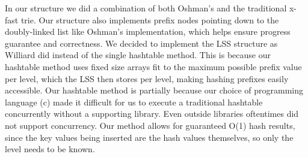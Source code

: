 \documentclass[10pt,twocolumn]{article}
\begin{document}
In our structure we did a combination of both Oshman's and the traditional x-fast trie.  Our structure also implements prefix nodes pointing down to the doubly-linked list like Oshman's implementation, which helps ensure progress guarantee and correctness.  We decided to implement the LSS structure as Williard did instead of the single hashtable method.  This is because our hashtable method uses fixed size arrays fit to the maximum possible prefix value per level, which the LSS then stores per level, making hashing prefixes easily accessible.  Our hashtable method is partially because our choice of programming language (c) made it difficult for us to execute a traditional hashtable concurrently without a supporting library.  Even outside libraries oftentimes did not support concurrency.  Our method allows for guaranteed O(1) hash results, since the key values being inserted are the hash values themselves, so only the level needs to be known.
\end{document}
